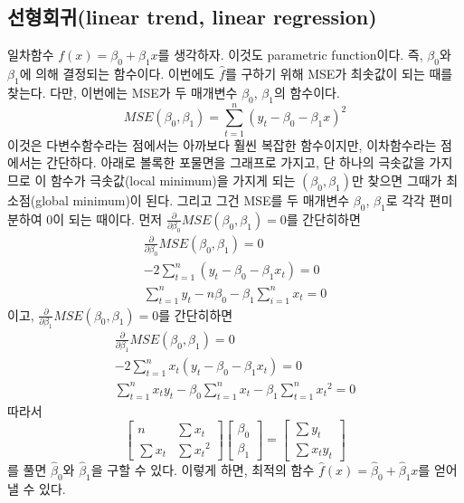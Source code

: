 \documentclass{article}
\begin{document}
\subsection{선형회귀(linear trend, linear regression)}
일차함수 \(f(x)=\beta_0+\beta_1x\)를 생각하자.\footnotemark
{}
이것도 parametric function이다.
즉, \(\beta_0\)와 \(\beta_1\)에 의해 결정되는 함수이다.
이번에도 \(\hat f\)를 구하기 위해 MSE가 최솟값이 되는 때를 찾는다.
다만, 이번에는 MSE가 두 매개변수 \(\beta_0\), \(\beta_1\)의 함수이다.
\[MSE(\beta_0,\beta_1)=\sum_{t=1}^n(y_t-\beta_0-\beta_1x)^2\]
이것은 다변수함수라는 점에서는 아까보다 훨씬 복잡한 함수이지만, 이차함수라는 점에서는 간단하다.
아래로 볼록한 포물면을 그래프로 가지고, 단 하나의 극솟값을 가지므로 이 함수가 극솟값(local minimum)을 가지게 되는 \((\beta_0, \beta_1)\)만 찾으면 그때가 최소점(global minimum)이 된다.
그리고 그건 MSE를 두 매개변수 \(\beta_0\), \(\beta_1\)로 각각 편미분하여 0이 되는 때이다.
먼저 \(\frac{\partial}{\partial\beta_0}MSE(\beta_0,\beta_1)=0\)를 간단히하면
\begin{gather*}
\frac{\partial}{\partial\beta_0}MSE(\beta_0,\beta_1)=0\\
-2\sum_{t=1}^n(y_t-\beta_0-\beta_1x_t)=0\\
\sum_{t=1}^ny_t-n\beta_0-\beta_1\sum_{i=1}^nx_t=0
\end{gather*}
이고, \(\frac{\partial}{\partial\beta_1}MSE(\beta_0,\beta_1)=0\)를 간단히하면
\begin{gather*}
\frac{\partial}{\partial\beta_1}MSE(\beta_0,\beta_1)=0\\
-2\sum_{t=1}^nx_t(y_t-\beta_0-\beta_1x_t)=0\\
\sum_{t=1}^nx_ty_t-\beta_0\sum_{t=1}^nx_t-\beta_1\sum_{t=1}^n{x_t}^2=0
\end{gather*}
따라서
\[
\begin{bmatrix}
n&\sum x_t\\
\sum x_t&\sum{x_t}^2
\end{bmatrix}
\begin{bmatrix}
\beta_0\\\beta_1
\end{bmatrix}
=
\begin{bmatrix}
\sum y_t\\\sum x_ty_t
\end{bmatrix}
\]
를 풀면 \(\hat\beta_0\)와 \(\hat\beta_1\)을 구할 수 있다.
이렇게 하면, 최적의 함수 \(\hat f(x)=\hat\beta_0+\hat\beta_1x\)를 얻어낼 수 있다.
\end{document}
